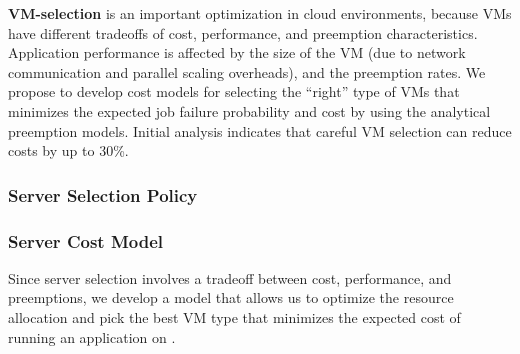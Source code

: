 \noindent \textbf{VM-selection} is an important optimization in cloud environments, because VMs have different tradeoffs of cost, performance, and preemption characteristics.
Application performance is affected by the size of the VM (due to network communication and parallel scaling overheads), and the preemption rates. 
We propose to develop cost models for selecting the ``right'' type of  VMs that minimizes the expected job failure probability and cost by using the analytical preemption models. 
Initial analysis indicates that careful VM selection can reduce costs by  up to 30\%.  



\subsubsection{Server Selection Policy}


\begin{comment}
We note that this search is different from conventional speedup plots in which the objective is to determine how well an application scales with increasing amount of resources and parallelism. 
In contrast, we \emph{fix} the total amount of resources allocated to the application's job ($=\mathcal{R}$), and only vary \emph{how} these resources are distributed, which affects communication overhead and hence the performance.
We assume that the total resource requirement for a job, $\mathcal{R}$, is provided by the user based on prior speedup data, the user's cloud budget, and the deadline for job completion.  
\end{comment}

\vspace*{\subsecspace}
\subsubsection{Server Cost Model}
\label{subsec:cost-model}

Since server selection involves a tradeoff between cost, performance, and preemptions, we develop a model that allows us to optimize the resource allocation and pick the best VM type that minimizes the expected cost of running an application on \sysname. 


